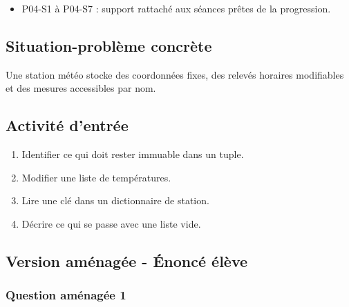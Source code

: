 \begin{itemize}
\tightlist
\item
  P04-S1 à P04-S7 : support rattaché aux séances prêtes de la
  progression.
\end{itemize}

\subsection{Situation-problème concrète}

Une station météo stocke des coordonnées fixes, des relevés horaires
modifiables et des mesures accessibles par nom.

\subsection{Activité d’entrée}

\begin{enumerate}
\def\labelenumi{\arabic{enumi}.}
\tightlist
\item
  Identifier ce qui doit rester immuable dans un tuple.
\item
  Modifier une liste de températures.
\item
  Lire une clé dans un dictionnaire de station.
\item
  Décrire ce qui se passe avec une liste vide.
\end{enumerate}

\subsection{Version aménagée - Énoncé élève}

\subsubsection{Question aménagée 1}

